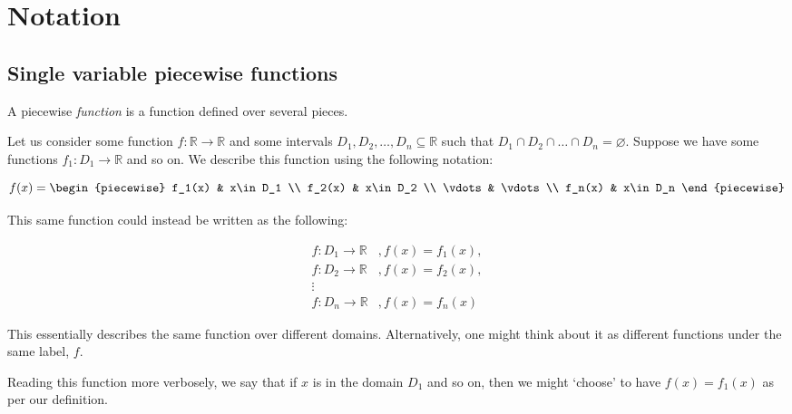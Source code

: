 \section{Notation}
\subsection{Single variable piecewise functions}
A piecewise \textit{function} is a function defined over several pieces. 

Let us consider some function $f:\mathbb{R}\to\mathbb{R}$ and some intervals ${D_1,D_2,\dots,D_n\subseteq\mathbb{R}}$ such that ${D_1\cap D_2\cap \dots\cap D_n=\varnothing}$. Suppose we have some functions $f_1: D_1\to\mathbb{R}$ and so on. We describe this function using the following notation:

$$
    f(x) = \begin{piecewise} 
                f_1(x) & x\in D_1 \\
                f_2(x) & x\in D_2 \\
                \vdots & \vdots \\
                f_n(x) & x\in D_n
            \end{piecewise}
$$

This same function could instead be written as the following:

\begin{align*}
    f:D_1\to\mathbb{R}&, f(x)=f_1(x), \\
    f:D_2\to\mathbb{R}&, f(x)=f_2(x), \\
    \vdots \\
    f:D_n\to\mathbb{R}&, f(x)=f_n(x)
\end{align*}

This essentially describes the same function over different domains. Alternatively, one might think about it as different functions under the same label, $f$.

Reading this function more verbosely, we say that if $x$ is in the domain $D_1$ and so on, then we might `choose' to have $f(x)=f_1(x)$ as per our definition.

